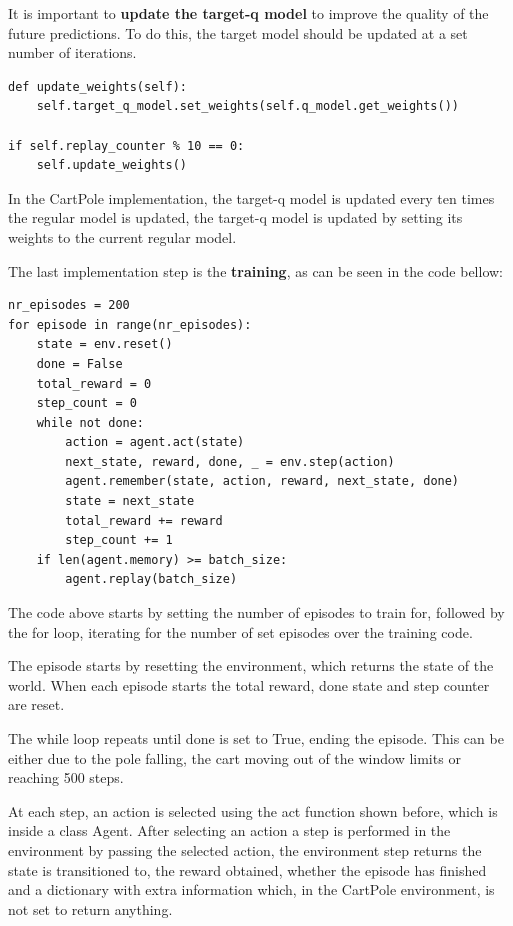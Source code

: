 It is important to \textbf{update the target-q model} to improve the quality of the future predictions. To do this, the target model should be updated at a set number of iterations.

\lstset{language=Python}
\lstset{frame=lines}
\lstset{basicstyle=\footnotesize}
\begin{lstlisting}
def update_weights(self):
    self.target_q_model.set_weights(self.q_model.get_weights())

if self.replay_counter % 10 == 0:
    self.update_weights()
\end{lstlisting}

In the CartPole implementation, the target-q model is updated every ten times the regular model is updated,
the target-q model is updated by setting its weights to the current regular model.

The last implementation step is the \textbf{training}, as can be seen in the code bellow:

\lstset{language=Python}
\lstset{frame=lines}
\lstset{basicstyle=\footnotesize}
\begin{lstlisting}
nr_episodes = 200
for episode in range(nr_episodes):
    state = env.reset()
    done = False
    total_reward = 0
    step_count = 0
    while not done:
        action = agent.act(state)
        next_state, reward, done, _ = env.step(action)
        agent.remember(state, action, reward, next_state, done)
        state = next_state
        total_reward += reward
        step_count += 1
    if len(agent.memory) >= batch_size:
        agent.replay(batch_size)
\end{lstlisting}

The code above starts by setting the number of episodes to train for, followed by the for loop, iterating for the number of set episodes over the training code.

The episode starts by resetting the environment, which returns the state of the world. When each episode starts the total reward, done state and step counter are reset.

The while loop repeats until done is set to True, ending the episode. This can be either due to the pole falling, the cart moving out of the window limits or reaching 500 steps.

At each step, an action is selected using the act function shown before, which is inside a class Agent. After selecting an action a step is performed in the environment by passing the selected action,
the environment step returns the state is transitioned to, the reward obtained, whether the episode has finished and a dictionary with extra information which, in the CartPole environment, is not set to return anything.

